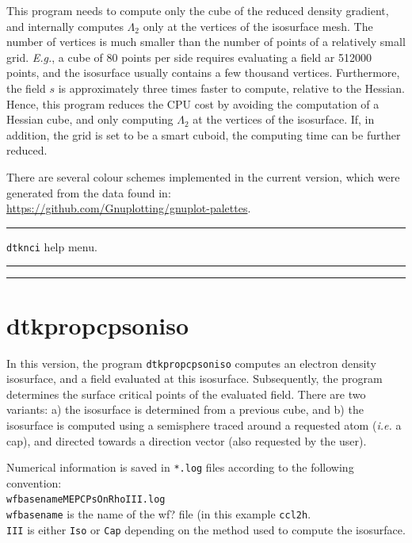 This program needs to compute only the cube of the reduced density gradient, and internally computes
$\Lambda_2$ only at the vertices of the isosurface mesh. The number of vertices is much smaller
than the number of points of a relatively small grid. \textit{E.g.}, a cube of 80 points per side
requires evaluating a field ar 512000 points, and the isosurface usually contains a few thousand
vertices. Furthermore, the field $s$ is approximately three times faster to compute, relative to
the Hessian. Hence, this program reduces the CPU cost by avoiding the
computation of a Hessian cube, and only computing $\Lambda_2$ at the vertices of the isosurface.
If, in addition, the grid is set to be a \DTK{} smart cuboid, the computing time can be further reduced.

There are several colour schemes implemented in the current version,
which were generated from the data found in:\\
\url{https://github.com/Gnuplotting/gnuplot-palettes}.


\rule{\textwidth}{1pt}
{\center\texttt{dtknci} help menu.\\}
\rule{\textwidth}{1pt}
\begin{footnotesize}
\end{footnotesize}
\rule{\textwidth}{1pt}

\newpage
\section{\label{sec:dtkpropcpsoniso}dtkpropcpsoniso}

In this version, the program \texttt{dtkpropcpsoniso} computes an electron density isosurface,
and a field evaluated at this isosurface. Subsequently, the program determines the surface
critical points of the evaluated field. There are two variants: a) the isosurface is
determined from a previous cube, and b) the isosurface is computed using a semisphere traced
around a requested atom (\textit{i.e.} a cap), and directed towards a direction vector
(also requested by the user).


Numerical information is saved in \texttt{*.log} files according to the
following convention:\\
\texttt{wfbasename{\color{blue}MEPCPsOnRho}{\color{red}III}.log}\\
\texttt{wfbasename} is the name of the wf? file (in this example \texttt{ccl2h}.\\
\texttt{\color{red}III} is either \texttt{Iso} or \texttt{Cap} depending on the method
used to compute the isosurface.

